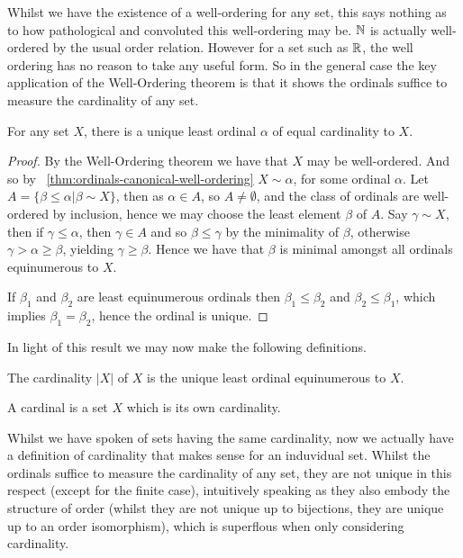 \documentclass[]{article}
\begin{document}
 Whilst we have the existence of a well-ordering for any set, this says nothing as to how pathological and convoluted this well-ordering may be. $\mathbb{N}$ is actually well-ordered by the usual order relation. However for a set such as $\mathbb{R}$, the well ordering has no reason to take any useful form. So in the general case the key application of the Well-Ordering theorem is that it shows the ordinals suffice to measure the cardinality of any set.

 \begin{thm}
 		For any set $X$, there is a unique least ordinal $\alpha$ of equal cardinality to $X$.
 \end{thm}

 \begin{proof}
		 By the Well-Ordering theorem we have that $X$ may be well-ordered. And so by ~\ref{thm:ordinals-canonical-well-ordering} $X \sim \alpha$, for some ordinal $\alpha$. Let $A = \{\beta \leq \alpha | \beta \sim X\}$, then as $\alpha \in A$, so $A \neq \emptyset$, and the class of ordinals are well-ordered by inclusion, hence we may choose the least element $\beta$ of $A$. Say $\gamma \sim X$, then if $\gamma \leq \alpha$, then $\gamma \in A$ and so $\beta \leq \gamma$ by the minimality of $\beta$, otherwise $\gamma > \alpha \geq \beta$, yielding $\gamma \geq \beta$. Hence we have that $\beta$ is minimal amongst all ordinals equinumerous to $X$. 

		 If $\beta_1$ and $\beta_2$ are least equinumerous ordinals then $\beta_1 \leq \beta_2$ and $\beta_2 \leq \beta_1$, which implies $\beta_1 = \beta_2$, hence the ordinal is unique.
 \end{proof}

 In light of this result we may now make the following definitions.

 \begin{defi} [Cardinality]
 		The cardinality $|X|$ of $X$ is the unique least ordinal equinumerous to $X$.
 \end{defi}

 \begin{defi} [Cardinal]
 		A cardinal is a set $X$ which is its own cardinality.	
 \end{defi}

 Whilst we have spoken of sets having the same cardinality, now we actually have a definition of cardinality that makes sense for an induvidual set. Whilst the ordinals suffice to measure the cardinality of any set, they are not unique in this respect (except for the finite case), intuitively speaking as they also embody the structure of order (whilst they are not unique up to bijections, they are unique up to an order isomorphism), which is superflous when only considering cardinality. 
		
\end{document}
